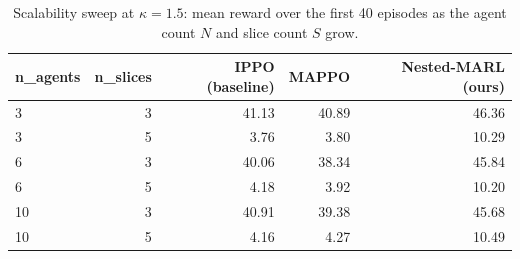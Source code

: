 \begin{table}[t]
\centering
\caption{Scalability sweep at $\kappa=1.5$: mean reward over the first 40 episodes as the agent count $N$ and slice count $S$ grow.}
\label{tab:scalability}
\footnotesize
\begin{tabular}{lrrrr}
\toprule
n\_agents & n\_slices & IPPO (baseline) & MAPPO & Nested-MARL (ours) \\
\midrule
3 & 3 & 41.13 & 40.89 & 46.36 \\
3 & 5 & 3.76 & 3.80 & 10.29 \\
6 & 3 & 40.06 & 38.34 & 45.84 \\
6 & 5 & 4.18 & 3.92 & 10.20 \\
10 & 3 & 40.91 & 39.38 & 45.68 \\
10 & 5 & 4.16 & 4.27 & 10.49 \\
\bottomrule
\end{tabular}
\end{table}
